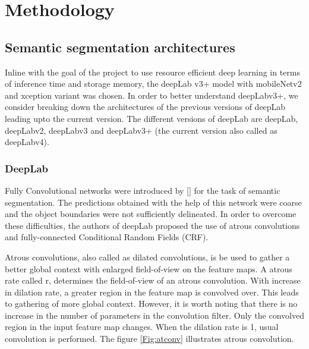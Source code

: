 \chapter{Methodology}


\section{Semantic segmentation architectures}
Inline with the goal of the project to use resource efficient deep learning in terms of inference time and storage memory, the deepLab v3+ model with mobileNetv2 and xception variant was chosen. In order to better understand deepLabv3+, we consider breaking down the architectures of the previous versions of deepLab leading upto the current version. The different versions of deepLab are deepLab, deepLabv2, deepLabv3 and deepLabv3+ (the current version also called as deepLabv4).

\subsection{DeepLab}

Fully Convolutional networks were introduced by [] for the task of semantic segmentation. The predictions obtained with the help of this network were coarse and the object boundaries were not sufficiently delineated. In order to overcome these difficulties, the authors of deepLab proposed the use of atrous convolutions and fully-connected Conditional Random Fields (CRF).

Atrous convolutions, also called as dilated convolutions, is be used to gather a better global context with enlarged field-of-view on the feature maps. A atrous rate called r, determines the field-of-view of an atrous convolution. With increase in dilation rate, a greater region in the feature map is convolved over. This leads to gathering of more global context. However, it is worth noting that there is no increase in the number of parameters in the convolution filter. Only the convolved region in the input feature map changes. When the dilation rate is 1, usual convolution is performed. The figure \ref{Fig:atconv} illustrates atrous convolution. 

